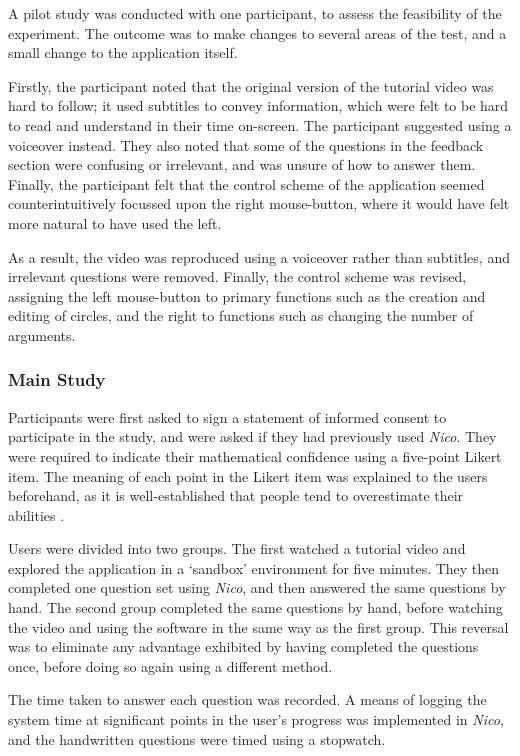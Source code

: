 \documentclass[12pt,twoside,notitlepage,xetex]{report}
\begin{document}
A pilot study was conducted with one participant, to assess the feasibility of the experiment.  The outcome was to make changes to several areas of the test, and a small change to the application itself.

Firstly, the participant noted that the original version of the tutorial video was hard to follow; it used subtitles to convey information, which were felt to be hard to read and understand in their time on-screen.  The participant suggested using a voiceover instead.  They also noted that some of the questions in the feedback section were confusing or irrelevant, and was unsure of how to answer them.  Finally, the participant felt that the control scheme of the application seemed counterintuitively focussed upon the right mouse-button, where it would have felt more natural to have used the left.

As a result, the video was reproduced using a voiceover rather than subtitles, and irrelevant questions were removed.  Finally, the control scheme was revised, assigning the left mouse-button to primary functions such as the creation and editing of circles, and the right to functions such as changing the number of arguments.

\subsubsection{Main Study}

Participants were first asked to sign a statement of informed consent to participate in the study, and were asked if they had previously used \emph{Nico}. They were required to indicate their mathematical confidence using a five-point Likert item.  The meaning of each point in the Likert item was explained to the users beforehand, as it is well-established that people tend to overestimate their abilities \cite{Mura1987}.

Users were divided into two groups.  The first watched a tutorial video and explored the application in a `sandbox' environment for five minutes.  They then completed one question set using \emph{Nico}, and then answered the same questions by hand.  The second group completed the same questions by hand, before watching the video and using the software in the same way as the first group.  This reversal was to eliminate any advantage exhibited by having completed the questions once, before doing so again using a different method.

The time taken to answer each question was recorded.  A means of logging the system time at significant points in the user's progress was implemented in \emph{Nico}, and the handwritten questions were timed using a stopwatch.
\end{document}
